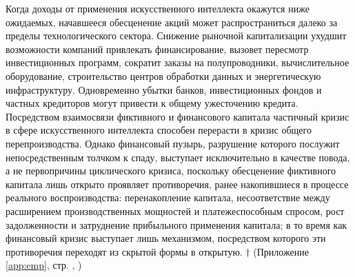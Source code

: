 Когда доходы от применения искусственного интеллекта окажутся ниже ожидаемых, начавшееся обесценение акций может распространиться далеко за пределы технологического сектора. Снижение рыночной капитализации ухудшит возможности компаний привлекать финансирование, вызовет пересмотр инвестиционных программ, сократит заказы на полупроводники, вычислительное оборудование, строительство центров обработки данных и энергетическую инфраструктуру. Одновременно убытки банков, инвестиционных фондов и частных кредиторов могут привести к общему ужесточению кредита. Посредством взаимосвязи фиктивного и финансового капитала частичный кризис в сфере искусственного интеллекта способен перерасти в кризис общего перепроизводства. Однако финансовый пузырь, разрушение которого послужит непосредственным толчком к спаду, выступает исключительно в качестве повода, а не первопричины циклического кризиса, поскольку обесценение фиктивного капитала лишь открыто проявляет противоречия, ранее накопившиеся в процессе реального воспроизводства: перенакопление капитала, несоответствие между расширением производственных мощностей и платежеспособным спросом, рост задолженности и затруднение прибыльного применения капитала; в то время как финансовый кризис выступает лишь механизмом, посредством которого эти противоречия переходят из скрытой формы в открытую. $\dagger$ (Приложение \ref{app:emp}, стр. \pageref{fig:indpro}, \pageref{fig:phases-duration})